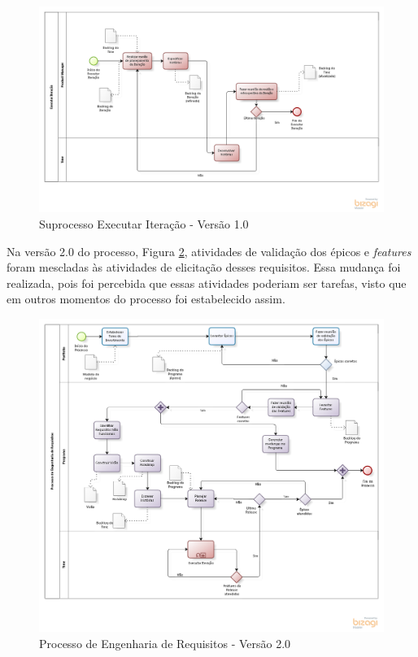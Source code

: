 \begin{figure}[!htb]
\includegraphics[scale=0.5]{figuras/iteracao1.png}
\caption{Suprocesso Executar Iteração - Versão 1.0}
\label{fig:iteracao1}
\end{figure}

Na versão 2.0 do processo, Figura \ref{fig:Processo2}, atividades de validação dos épicos e \textit{features} foram mescladas às atividades de elicitação desses requisitos.
Essa mudança foi realizada, pois foi percebida que essas atividades poderiam ser tarefas, visto que em outros momentos do processo foi estabelecido assim.\\

\begin{figure}[!htb]
\flushleft
\includegraphics[scale=0.5]{figuras/processo2.png}
\caption{Processo de Engenharia de Requisitos - Versão 2.0}
\label{fig:Processo2}
\end{figure}
